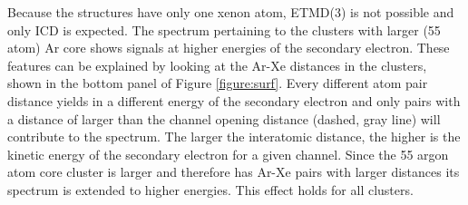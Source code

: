 Because the structures have only one xenon atom, ETMD(3) is not possible
and only ICD is expected. 
The spectrum pertaining to the clusters with larger (55 atom) Ar core shows
signals at higher energies of the secondary electron. These features
can be explained by looking at the Ar-Xe distances in the clusters, shown
in the bottom panel of Figure \ref{figure:surf}. 
Every different atom pair distance
yields in a different energy of the secondary electron and only pairs
with a distance of larger than the channel opening distance
(dashed, gray line) will contribute
to the spectrum. 
The larger the interatomic distance, the higher is the
kinetic energy of the secondary electron for a given channel.
Since the 55 argon atom core cluster is larger and therefore
has Ar-Xe pairs with larger distances its spectrum is extended to
higher energies.
This effect holds for all clusters.

